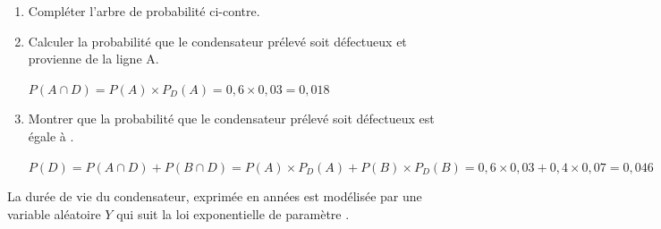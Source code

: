 \begin{enumerate}[series=monDS, resume]
    \item Compléter l'arbre de probabilité ci-contre.
    \medskip

    \item Calculer la probabilité que le condensateur prélevé soit défectueux et provienne de la ligne A.
    \begin{blocvisiblex}[height=2.]
    {\quad}
    $P(A\cap D)=P(A) \times P_D(A)=0,6 \times 0,03=0,018$
    \end{blocvisiblex}
    \medskip
    \item Montrer que la probabilité que le condensateur prélevé soit défectueux est égale à .
    \begin{blocvisiblex}[height=2.]
    {\quad}
    $P(D)=P(A\cap D)+P(B\cap D)=P(A) \times P_D(A)+P(B) \times P_D(B)=0,6 \times 0,03+0,4 \times 0,07=0,046$
    \end{blocvisiblex}
    \medskip
\end{enumerate}








La durée de vie du condensateur, exprimée en années est modélisée par une variable aléatoire $Y$ qui suit la loi exponentielle de paramètre .

